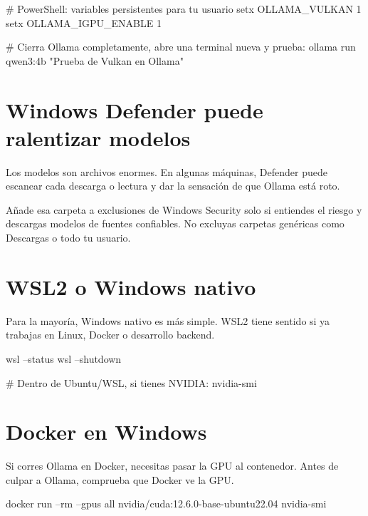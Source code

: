 \documentclass[11pt,a4paper]{book}
\begin{document}
\begin{codebox}
# PowerShell: variables persistentes para tu usuario
setx OLLAMA_VULKAN 1
setx OLLAMA_IGPU_ENABLE 1

# Cierra Ollama completamente, abre una terminal nueva y prueba:
ollama run qwen3:4b "Prueba de Vulkan en Ollama"
\end{codebox}
\section{Windows Defender puede ralentizar modelos}
Los modelos son archivos enormes. En algunas máquinas, Defender puede escanear cada descarga o lectura y dar la sensación de que Ollama está roto.

Añade esa carpeta a exclusiones de Windows Security solo si entiendes el riesgo y descargas modelos de fuentes confiables. No excluyas carpetas genéricas como Descargas o todo tu usuario.

\section{WSL2 o Windows nativo}
Para la mayoría, Windows nativo es más simple. WSL2 tiene sentido si ya trabajas en Linux, Docker o desarrollo backend.

\begin{codebox}
wsl --status
wsl --shutdown

# Dentro de Ubuntu/WSL, si tienes NVIDIA:
nvidia-smi
\end{codebox}
\section{Docker en Windows}
Si corres Ollama en Docker, necesitas pasar la GPU al contenedor. Antes de culpar a Ollama, comprueba que Docker ve la GPU.

\begin{codebox}
docker run --rm --gpus all nvidia/cuda:12.6.0-base-ubuntu22.04 nvidia-smi
\end{codebox}
\end{document}
